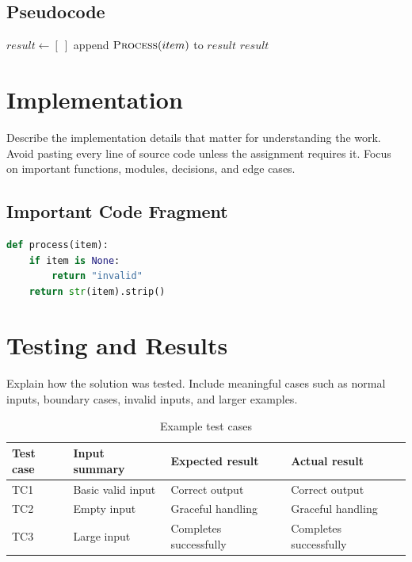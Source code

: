 \documentclass[12pt,a4paper]{article}
\begin{document}
\subsection{Pseudocode}

\begin{algorithm}[htbp]
  \caption{Process Input Data}
  \label{alg:process-input-data}
  \begin{algorithmic}[1]
      \State $result \gets [\ ]$
        \State append $\Call{Process}{item}$ to $result$
      \EndFor
      \State \Return $result$
    \EndProcedure
  \end{algorithmic}
\end{algorithm}

\section{Implementation}

Describe the implementation details that matter for understanding the work. Avoid pasting every line of source code unless the assignment requires it. Focus on important functions, modules, decisions, and edge cases.

\subsection{Important Code Fragment}

\begin{lstlisting}[language=Python,caption={Replace with a relevant code fragment},label={lst:process-item}]
def process(item):
    if item is None:
        return "invalid"
    return str(item).strip()
\end{lstlisting}

\section{Testing and Results}

Explain how the solution was tested. Include meaningful cases such as normal inputs, boundary cases, invalid inputs, and larger examples.

\begin{table}[htbp]
  \centering
  \caption{Example test cases}
  \label{tab:test-cases}
  \begin{tabular}{llll}
    \toprule
    Test case & Input summary & Expected result & Actual result \\
    \midrule
    TC1 & Basic valid input & Correct output & Correct output \\
    TC2 & Empty input & Graceful handling & Graceful handling \\
    TC3 & Large input & Completes successfully & Completes successfully \\
    \bottomrule
  \end{tabular}
\end{table}
\end{document}
